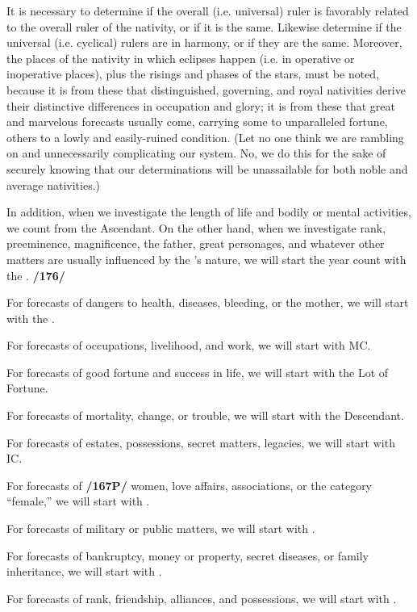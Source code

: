 It is necessary to determine if the overall (i.e. universal) ruler is favorably related to the overall ruler of the nativity, or if it is the same. Likewise determine if the universal (i.e. cyclical) rulers are in harmony, or if they are the same. \mndl Moreover, the places of the nativity in which eclipses happen (i.e. in operative or inoperative places), plus the risings and phases of the stars, must be noted, because it is from these that distinguished, governing, and royal nativities derive their distinctive differences in occupation and glory; it is from these that great and marvelous forecasts usually come, carrying some to unparalleled fortune, others to a lowly and easily-ruined condition. (Let no one think we are rambling on and unnecessarily complicating our system. No, we do this for
the sake of securely knowing that our determinations will be unassailable for both noble and average nativities.)

In addition, when we investigate the length of life and bodily or mental activities, we count from the Ascendant. On the other hand, when we investigate rank, preeminence, magnificence, the father, great personages, and whatever other matters are usually influenced by the \Sun’s nature, we will start the year count with the \Sun. \textbf{/176/} 

For forecasts of dangers to health, diseases, bleeding, or the mother, we will start with the \Moon. 

For forecasts of occupations, livelihood, and work, we will start with MC. 

For forecasts of good fortune and success in life, we will start with the Lot of Fortune. 

For forecasts of mortality, change, or trouble, we will start with the Descendant. 

For forecasts of estates, possessions, secret matters, legacies, we will start with IC. 

For forecasts of \textbf{/167P/} women, love affairs, associations, or the category “female,” we will start with \Venus. 

For forecasts of military or public matters, we will start with \Mars.

For forecasts of bankruptcy, money or property, secret diseases, or family inheritance, we will start with
\Saturn. 

For forecasts of rank, friendship, alliances, and possessions, we will start with \Jupiter. 

